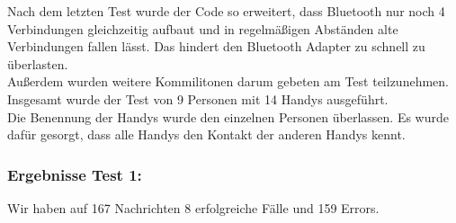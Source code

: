 Nach dem letzten Test wurde der Code so erweitert, dass Bluetooth nur
noch 4 Verbindungen gleichzeitig aufbaut und in regelmäßigen Abständen
alte Verbindungen fallen lässt. Das hindert den Bluetooth Adapter zu
schnell zu überlasten.\\

Außerdem wurden weitere Kommilitonen darum gebeten am Test teilzunehmen.
Insgesamt wurde der Test von 9 Personen mit 14 Handys ausgeführt.\\

Die Benennung der Handys wurde den einzelnen Personen überlassen. Es
wurde dafür gesorgt, dass alle Handys den Kontakt der anderen Handys
kennt.\\

\subsubsection{Ergebnisse Test 1:}\label{ergebnisse-test-1-1}

Wir haben auf 167 Nachrichten 8 erfolgreiche Fälle und 159 Errors.

